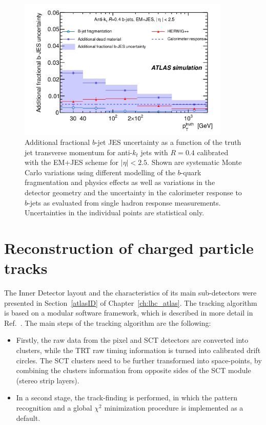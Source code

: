 \begin{figure}[htbp]
  \begin{center}
      \includegraphics[width=0.9\textwidth]{bjetsJESUncertainty.png}
    \caption{Additional fractional $b$-jet JES uncertainty as a function of the truth jet transverse momentum for anti-$k_t$ jets with $R=0.4$ calibrated with the EM+JES scheme for $|\eta| < 2.5$. Shown are systematic Monte Carlo variations using different modelling of the $b$-quark fragmentation and physics effects as well as variations in the detector geometry and the uncertainty in the calorimeter response to $b$-jets as evaluated from single hadron response measurements.  Uncertainties in the individual points are statistical only. }
    \label{fig:bjetJESuncertainty}
  \end{center}
\end{figure}


\section{Reconstruction of charged particle tracks}\label{sec:trackreco}

The Inner Detector layout and the characteristics of its main sub-detectors were presented in Section~\ref{atlasID} of Chapter~\ref{ch:lhc_atlas}. The tracking algorithm is based on a modular software framework, which is described in more detail in Ref.~\cite{Cornelissen:1020106}. The main steps of the tracking algorithm are the following:

\begin{itemize}
\item
Firstly, the raw data from the pixel and SCT detectors are converted into clusters, while the TRT raw timing information is turned into calibrated drift circles. The SCT clusters need to be further transformed into space-points, by combining the clusters information from opposite sides of the SCT module (stereo strip layers).
\item
In a second stage, the track-finding is performed, in which the pattern recognition and a global $\chi^2$ minimization procedure is implemented as a default.
\end{itemize}

